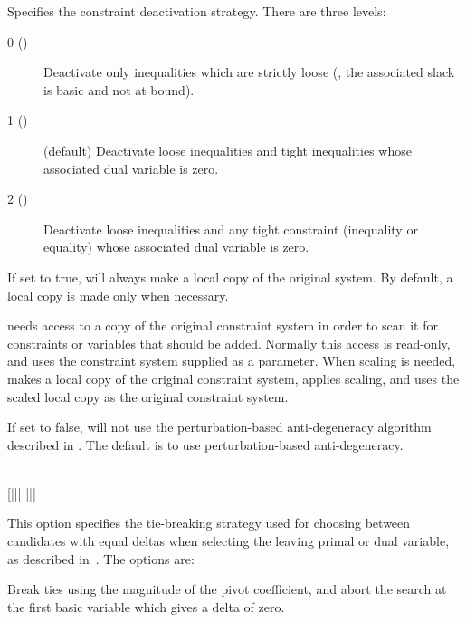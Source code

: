 \begin{codedoc}
\begin{itemize}
    Specifies the constraint deactivation strategy.
    There are three levels:
    \begin{description}
      \item[0 ()] Deactivate only inequalities which are strictly
	loose (\ie, the associated slack is basic and not at bound).

      \item[1 ()] (default) Deactivate loose inequalities and
	tight inequalities whose associated dual variable is zero.

      \item[2 ()] Deactivate loose inequalities and any
	tight constraint (inequality or equality) whose associated dual
	variable is zero.
    \end{description}

  \end{itemize}

  \item{}
    \kw{;}

  If set to true, \dylp will always make a local copy of the original system.
  By default, a local copy is made only when necessary.

  \dylp needs access to a copy of the original constraint system in order to
  scan it for constraints or variables that should be added.
  Normally this access is read-only, and \dylp uses the constraint system
  supplied as a parameter.
  When scaling is needed, \dylp makes a local copy of the original constraint
  system, applies scaling, and uses the scaled local copy as the original
  constraint system.

  \item{}
    \kw{;}

  If set to false, \dylp will not use the perturbation-based anti-degeneracy
  algorithm described in .
  The default is to use perturbation-based anti-degeneracy.

  \item{}
  \bgroup\raggedright
     \\
    \hfil
    [|||
     ||] \kw{;}
  \egroup

  This option specifies the tie-breaking strategy used for choosing
  between candidates with equal deltas when selecting the
  leaving primal or dual variable, as described in~.
  The options are:
  \begin{description}[0 (\kw{pivotabort})]
    \item[0 (\kw{pivotabort})]
    Break ties using the magnitude of the pivot coefficient, and abort the
    search at the first basic variable which gives a delta of zero.


\end{description}
\end{codedoc}
